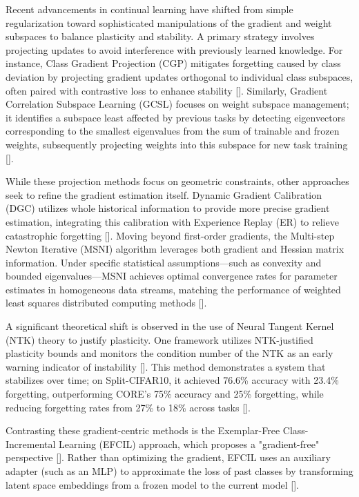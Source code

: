 \documentclass[11pt]{article}
\begin{document}
Recent advancements in continual learning have shifted from simple regularization toward sophisticated manipulations of the gradient and weight subspaces to balance plasticity and stability. A primary strategy involves projecting updates to avoid interference with previously learned knowledge. For instance, Class Gradient Projection (CGP) mitigates forgetting caused by class deviation by projecting gradient updates orthogonal to individual class subspaces, often paired with contrastive loss to enhance stability [\citep{2311.14905}]. Similarly, Gradient Correlation Subspace Learning (GCSL) focuses on weight subspace management; it identifies a subspace least affected by previous tasks by detecting eigenvectors corresponding to the smallest eigenvalues from the sum of trainable and frozen weights, subsequently projecting weights into this subspace for new task training [\citep{2403.02334}].

While these projection methods focus on geometric constraints, other approaches seek to refine the gradient estimation itself. Dynamic Gradient Calibration (DGC) utilizes whole historical information to provide more precise gradient estimation, integrating this calibration with Experience Replay (ER) to relieve catastrophic forgetting [\citep{2407.20956}]. Moving beyond first-order gradients, the Multi-step Newton Iterative (MSNI) algorithm leverages both gradient and Hessian matrix information. Under specific statistical assumptions—such as convexity and bounded eigenvalues—MSNI achieves optimal convergence rates for parameter estimates in homogeneous data streams, matching the performance of weighted least squares distributed computing methods [\citep{2508.07419}].

A significant theoretical shift is observed in the use of Neural Tangent Kernel (NTK) theory to justify plasticity. One framework utilizes NTK-justified plasticity bounds and monitors the condition number of the NTK as an early warning indicator of instability [\citep{2511.02025}]. This method demonstrates a system that stabilizes over time; on Split-CIFAR10, it achieved 76.6\% accuracy with 23.4\% forgetting, outperforming CORE's 75\% accuracy and 25\% forgetting, while reducing forgetting rates from 27\% to 18\% across tasks [\citep{2511.02025}].

Contrasting these gradient-centric methods is the Exemplar-Free Class-Incremental Learning (EFCIL) approach, which proposes a "gradient-free" perspective [\citep{2504.01219}]. Rather than optimizing the gradient, EFCIL uses an auxiliary adapter (such as an MLP) to approximate the loss of past classes by transforming latent space embeddings from a frozen model to the current model [\citep{2504.01219}].
\end{document}
